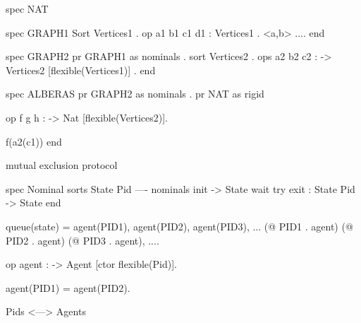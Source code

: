 spec NAT 

spec GRAPH1 
 Sort Vertices1 .
 op a1 b1 c1 d1 : Vertices1 .
 <a,b> ....
end

spec GRAPH2 
 pr GRAPH1 as nominals .
 sort Vertices2 .
 ops a2 b2 c2 : -> Vertices2 [flexible(Vertices1)] . 
end  

spec ALBERAS 
 pr GRAPH2 as nominals .
 pr NAT as rigid

 op f g h : -> Nat [flexible(Vertices2)].
 
 f(a2(c1))
end 

mutual exclusion protocol

spec Nominal 
sorts State Pid  ---- nominals
init -> State
wait try exit : State Pid -> State  
end 

queue(state) = agent(PID1), agent(PID2), agent(PID3), ...
               (@ PID1 . agent) (@ PID2 . agent) (@ PID3 . agent), ....
               

op agent : -> Agent [ctor flexible(Pid)].

agent(PID1) = agent(PID2).

Pids <---> Agents
 
 
